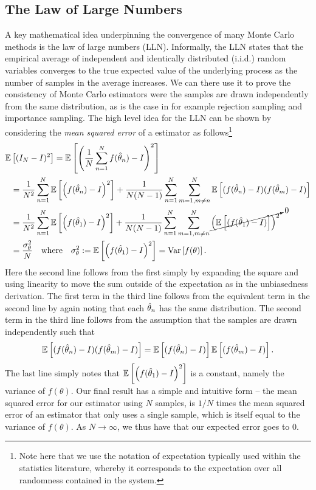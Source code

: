 \subsection{The Law of Large Numbers}
\label{sec:inf:mc:law}

A key mathematical idea underpinning the convergence of many Monte Carlo methods is the 
law of large numbers (LLN).  Informally, the LLN states that the empirical average of 
independent and identically distributed (i.i.d.)  random variables converges to 
the true expected value of the underlying process as the number of samples in the
average increases.  We can there use it to prove the consistency of Monte Carlo estimators
were the samples are drawn independently from the same distribution, as is the case
in for example rejection sampling and importance sampling.  The high level idea for the LLN can be shown by
considering the  \emph{mean squared error} of a \mc estimator as 
follows\footnote{Note here that we use the notation of expectation typically used within the statistics literature,
whereby it corresponds to the expectation over all randomness contained in the system.}
\begin{align}
\mathbb{E} &\left[(I_N-I)^2\right] = \mathbb{E}\left[\left(\frac{1}{N}\sum_{n=1}^{N}f(\hat{\theta}_n) - I\right)^2\right] \nonumber \\
&= \frac{1}{N^2}\sum_{n=1}^{N} \mathbb{E}\left[ \left(f(\hat{\theta}_n)-I\right)^2\right] + 
\frac{1}{N(N-1)}\sum_{n=1}^{N}\sum_{m=1,m\neq n}^{N} \mathbb{E}\left[ (f(\hat{\theta}_n)-I)(f(\hat{\theta}_m)-I)\right] \nonumber \\
&= \frac{1}{N^2}\sum_{n=1}^{N} \mathbb{E}\left[ \left(f(\hat{\theta}_1)-I\right)^2\right] + 
\frac{1}{N(N-1)}\sum_{n=1}^{N}\sum_{m=1,m\neq n}^{N} \cancelto{0}{\left(\mathbb{E}\left[(f(\hat{\theta}_1)-I)\right]\right)^2} \nonumber \\
&= \frac{\sigma_{\theta}^2}{N}  \quad \text{where} \quad \sigma_{\theta}^2 := \mathbb{E}\left[ \left(f(\hat{\theta}_1)-I\right)^2\right]
= \mathrm{Var} \left[f(\theta)\right].\label{eq:inf:LLN-informal}
\end{align}
Here the second line follows from the first simply by expanding the square and using linearity
to move the sum outside of the expectation as in the unbiasedness derivation.
The first term in the third line follows from the equivalent term in the second line by again noting that
each $\hat{\theta}_n$ has the same distribution.  The second term in the third line
follows from the assumption that the samples are drawn independently such that
\[
\mathbb{E}\left[ (f(\hat{\theta}_n)-I)(f(\hat{\theta}_m)-I)\right] = \mathbb{E}\left[ (f(\hat{\theta}_n)-I)\right] \mathbb{E}\left[(f(\hat{\theta}_m)-I)\right].
\]
The last line simply notes that $\mathbb{E}\left[ \left(f(\hat{\theta}_1)-I\right)^2\right]$ is a constant,
namely the variance of $f(\theta)$.
  Our final result has a simple and intuitive form -- the mean squared error for
our estimator using $N$ samples, is $1/N$ times the mean squared error of an estimator that only uses
a single sample, which is itself equal to the variance of $f(\theta)$.  As $N\rightarrow\infty$, we thus
have that our expected error goes to $0$.

